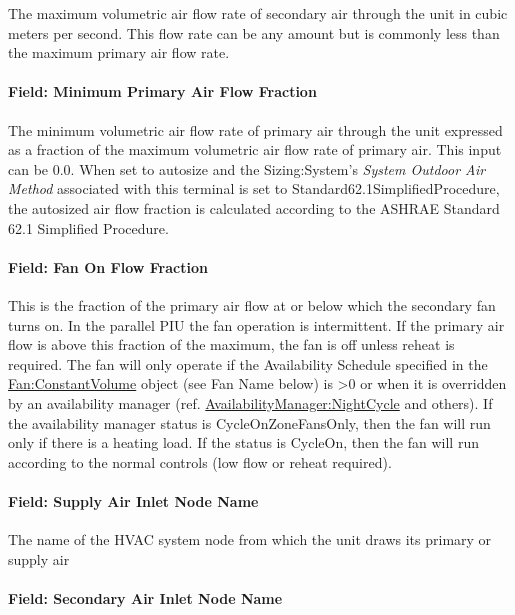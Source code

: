 The maximum volumetric air flow rate of secondary air through the unit in cubic meters per second. This flow rate can be any amount but is commonly less than the maximum primary air flow rate.

\paragraph{Field: Minimum Primary Air Flow Fraction}\label{field-minimum-primary-air-flow-fraction-1}

The minimum volumetric air flow rate of primary air through the unit expressed as a fraction of the maximum volumetric air flow rate of primary air. This input can be 0.0. When set to autosize and the Sizing:System's \emph{System Outdoor Air Method} associated with this terminal is set to Standard62.1SimplifiedProcedure, the autosized air flow fraction is calculated according to the ASHRAE Standard 62.1 Simplified Procedure.

\paragraph{Field: Fan On Flow Fraction}\label{field-fan-on-flow-fraction}

This is the fraction of the primary air flow at or below which the secondary fan turns on. In the parallel PIU the fan operation is intermittent. If the primary air flow is above this fraction of the maximum, the fan is off unless reheat is required. The fan will only operate if the Availability Schedule specified in the \hyperref[fanconstantvolume]{Fan:ConstantVolume} object (see Fan Name below) is >0 or when it is overridden by an availability manager (ref. \hyperref[availabilitymanagernightcycle]{AvailabilityManager:NightCycle} and others). If the availability manager status is CycleOnZoneFansOnly, then the fan will run only if there is a heating load.  If the status is CycleOn, then the fan will run according to the normal controls (low flow or reheat required).

\paragraph{Field: Supply Air Inlet Node Name}\label{field-supply-air-inlet-node-name-1}

The name of the HVAC system node from which the unit draws its primary or supply air

\paragraph{Field: Secondary Air Inlet Node Name}\label{field-secondary-air-inlet-node-name-1}

